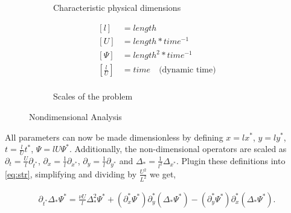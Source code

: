 \begin{figure}[h]
  \centering
  \begin{subfigure}[b]{0.42\textwidth}
    \centering

    \caption{Characteristic physical dimensions}
    \label{fig:cav_dim}
  \end{subfigure}
  \begin{subfigure}[b]{0.42\textwidth}
    \centering
    \begin{align*}
    \left[ l \right] &= length \\
    \left[ U \right] &= length*time^{-1} \\
    \left[ \Psi \right] &= length^2*time^{-1} \\
    \left[ \frac{l}{U} \right] &= time \quad \text{(dynamic time)} \\
    \end{align*}

    \caption{Scales of the problem}
    \label{eq:scl}
  \end{subfigure}
  \caption{Nondimensional Analysis}
\end{figure}

All parameters can now be made dimensionless by defining $x = l x^*$, $y = l
y^*$, $t = \frac{l}{U} t^*$, $\Psi = lU \Psi^*$. Additionally, the
non-dimensional operators are scaled as $\partial_t = \frac{U}{l}
\partial_{t^*}$, $\partial_x = \frac{1}{l} \partial_{x^*}$, $\partial_y =
\frac{1}{l} \partial_{y^*}$ and $\Delta_* = \frac{1}{l^2} \Delta_{x^*}$. Plugin
these definitions into \eqref{eq:str}, simplifying and dividing by
$\frac{U^2}{L^2}$ we get,

\begin{align*}
\partial_{t^*} \Delta_* \Psi^* = \frac{\nu U}{l} \Delta^2_* \Psi^*
  + (\partial_x^* \Psi^*) \partial_y^*(\Delta_* \Psi^*)
  - (\partial_y^* \Psi^*) \partial_x^*(\Delta_* \Psi^*). 
\end{align*}

